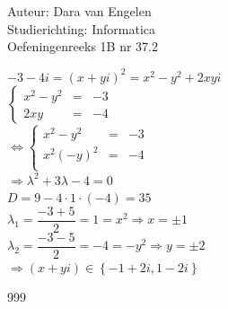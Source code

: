 \documentclass[a4paper]{article}
\begin{document}
  
\noindent \large Auteur: Dara van Engelen \\
\noindent \large Studierichting: Informatica\\
\noindent \large Oefeningenreeks 1B nr 37.2\\

\medskip

\normalsize

$-3-4i = (x+yi)^2 = x^2 - y^2 + 2xyi$ \\

$\left\{
	\begin{array}{lll} 
		x^2 - y^2 &=& -3 \\
		2xy &=& -4
	\end{array}
\right .$\\

$\Leftrightarrow\left\{
	\begin{array}{lll} 
		x^2 - y^2 &=& -3\\
		x^2(-y)^2 &=& -4\\
	\end{array}
\right .$\\

$\Rightarrow\lambda^2 + 3\lambda -4 = 0$\\

$ D = 9-4\cdot 1 \cdot (-4) = 35$\\

$\lambda_1 = \dfrac{-3+5}{2}  = 1 = x^2 \Rightarrow x = \pm1$\\

$\lambda_2 = \dfrac{-3-5}{2} = -4 = -y^2 \Rightarrow y = \pm2$\\

$\Rightarrow (x+yi) \in \left \{ -1+2i , 1-2i\right\}$


\begin{thebibliography}{999}
\end{thebibliography}
\end{document}
